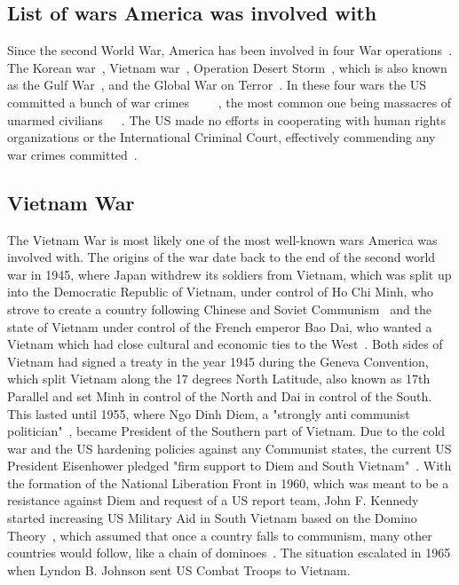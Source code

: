 \documentclass[12pt,a4paper]{article}
\begin{document}
		\subsection{List of wars America was involved with}
		Since the second World War, America has been involved in four War operations~\cite{va-gov-american-wars}.
		The Korean war~\cite{va-gov-american-wars}, Vietnam war~\cite{va-gov-american-wars}, Operation Desert Storm~\cite{va-gov-american-wars}, which is also known as the Gulf War~\cite{defense-gov-gulf}, and the Global War on Terror~\cite{va-gov-american-wars}.
		In these four wars the US committed a bunch of war crimes ~\cite{globalpolicy-iraq-warcrimes}~\cite{historynews-vietnam-warcrimes}~\cite{hrw-hr-abuses-afghanistan}~\cite{washingtonpost-korea-warcrimes}, the most common one being massacres of unarmed civilians~\cite{asiasociety-nogun-ri}~\cite{history-my-lai}~\cite{theguardian-shinwar-shooting}. The US made no efforts in cooperating with human rights organizations or the International Criminal Court, effectively commending any war crimes committed~\cite{globaltimes-us-evade-warcrimes}.
		\subsection{Vietnam War}
		The Vietnam War is most likely one of the most well-known wars America was involved with.
		The origins of the war date back to the end of the second world war in 1945, where Japan withdrew its soldiers from Vietnam, which was split up into the Democratic Republic of Vietnam, under control of Ho Chi Minh, who strove to create a country following Chinese and Soviet Communism~\cite{vietnam-war-history} and the state of Vietnam under control of the French emperor Bao Dai, who wanted a Vietnam which had close cultural and economic ties to the West~\cite{vietnam-war-history}.
		Both sides of Vietnam had signed a treaty in the year 1945 during the Geneva Convention, which split Vietnam along the 17 degrees North Latitude, also known as 17th Parallel and set Minh in control of the North and Dai in control of the South.
		This lasted until 1955, where Ngo Dinh Diem, a "strongly anti communist politician"~\cite{vietnam-war-history}, became President of the Southern part of Vietnam. Due to the cold war and the US hardening policies against any Communist states, the current US President Eisenhower pledged "firm support to Diem and South Vietnam"~\cite{vietnam-war-history}.
		With the formation of the National Liberation Front in 1960, which was meant to be a resistance against Diem and request of a US report team, John F. Kennedy started increasing US Military Aid in South Vietnam based on the Domino Theory~\cite{vietnam-war-history}, which assumed that once a country falls to communism, many other countries would follow, like a chain of dominoes~\cite{cold-war-domino-theory}.
		The situation escalated in 1965 when Lyndon B. Johnson sent US Combat Troops to Vietnam.
\end{document}
